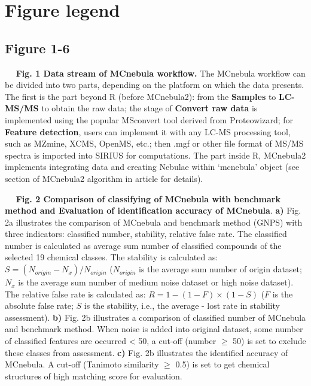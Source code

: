 \documentclass[
]{article}
\author{}
\date{\vspace{-2.5em}}
\begin{document}
\hypertarget{figure-legend}{%
\section{Figure legend}\label{figure-legend}}

\hypertarget{figure-1-6}{%
\subsection{Figure 1-6}\label{figure-1-6}}

   \textbf{Fig. 1 \textbar{} Data stream of MCnebula workflow.} The
MCnebula workflow can be divided into two parts, depending on the
platform on which the data presents. The first is the part beyond R
(before MCnebula2): from the \textbf{Samples} to \textbf{LC-MS/MS} to
obtain the raw data; the stage of \textbf{Convert raw data} is
implemented using the popular MSconvert tool derived from Proteowizard;
for \textbf{Feature detection}, users can implement it with any LC-MS
processing tool, such as MZmine, XCMS, OpenMS, etc.; then .mgf or other
file format of MS/MS spectra is imported into SIRIUS for computations.
The part inside R, MCnebula2 implements integrating data and creating
Nebulae within `mcnebula' object (see section of MCnebula2 algorithm in
article for details).

   \textbf{Fig. 2 \textbar{} Comparison of classifying of MCnebula with
benchmark method and Evaluation of identification accuracy of MCnebula}.
\textbf{a)} Fig. 2a illustrates the comparison of MCnebula and benchmark
method (GNPS) with three indicators: classified number, stability,
relative false rate. The classified number is calculated as average sum
number of classified compounds of the selected 19 chemical classes. The
stability is calculated as: \(S = (N_{origin} - N_{x}) / N_{origin}\)
(\(N_{origin}\) is the average sum number of origin dataset; \(N_{x}\)
is the average sum number of medium noise dataset or high noise
dataset). The relative false rate is calculated as:
\(R = 1 - (1 - F) \times (1 - S)\) (\(F\) is the absolute false rate;
\(S\) is the stability, i.e., the average - lost rate in stability
assessment). \textbf{b)} Fig. 2b illustrates a comparison of classified
number of MCnebula and benchmark method. When noise is added into
original dataset, some number of classified features are occurred
\textless{} 50, a cut-off (number \(\geq\) 50) is set to exclude these
classes from assessment. \textbf{c)} Fig. 2b illustrates the identified
accuracy of MCnebula. A cut-off (Tanimoto similarity \(\geq\) 0.5) is
set to get chemical structures of high matching score for evaluation.
\end{document}
